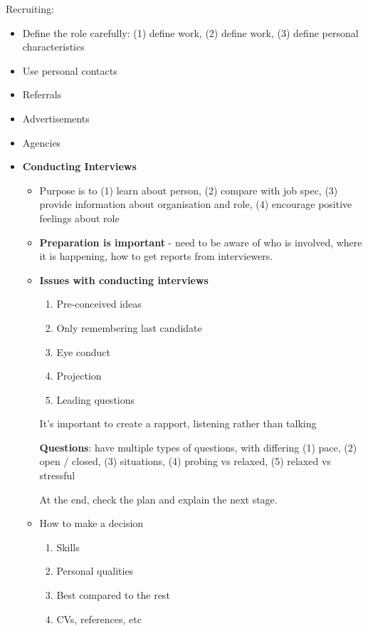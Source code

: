 \documentclass{article}
\begin{document}
\begin{multicols}{2}
Recruiting:
\begin{itemize}
    \item Define the role carefully: (1) define work, (2) define work, (3) define personal characteristics
    \item Use personal contacts
    \item Referrals
    \item Advertisements
    \item Agencies
    \item \textbf{Conducting Interviews}
    \begin{itemize}
        \item Purpose is to (1) learn about person, (2) compare with job spec, (3) provide information about organisation and role, (4) encourage positive feelings about role
        \item \textbf{Preparation is important} - need to be aware of who is involved, where it is happening, how to get reports from interviewers.
        \item \textbf{Issues with conducting interviews}
        \begin{enumerate}
            \item Pre-conceived ideas
            \item Only remembering last candidate
            \item Eye conduct
            \item Projection
            \item Leading questions
        \end{enumerate}
        
        It's important to create a rapport, listening rather than talking
        
        \textbf{Questions}: have multiple types of questions, with differing (1) pace, (2) open / closed, (3) situations, (4) probing vs relaxed, (5) relaxed vs stressful
        
        At the end, check the plan and explain the next stage.
        
        \item How to make a decision
        \begin{enumerate}
            \item Skills
            \item Personal qualities
            \item Best compared to the rest
            \item CVs, references, etc
        \end{enumerate}
    \end{itemize}
    

\end{itemize}
\end{multicols}
\end{document}
